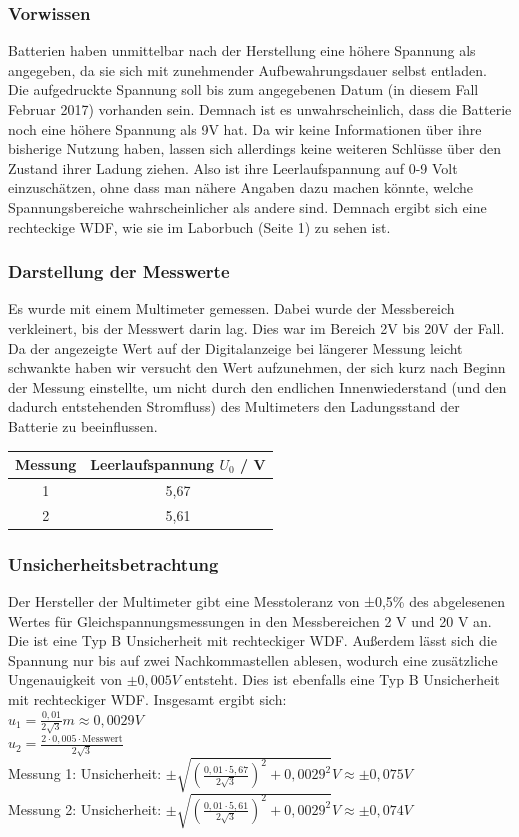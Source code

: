 \documentclass[
	a4paper,
	12pt,
	pagesize,
	ngerman
]{scrartcl}
\begin{document}
	\subsubsection{Vorwissen}
	Batterien haben unmittelbar nach der Herstellung eine höhere Spannung als angegeben, da sie sich mit zunehmender Aufbewahrungsdauer selbst entladen. Die aufgedruckte Spannung soll bis zum angegebenen Datum (in diesem Fall Februar 2017) vorhanden sein. Demnach ist es unwahrscheinlich, dass die Batterie noch eine höhere Spannung als 9V hat. Da wir keine Informationen über ihre bisherige Nutzung haben, lassen sich allerdings keine weiteren Schlüsse über den Zustand ihrer Ladung ziehen. Also ist ihre Leerlaufspannung auf 0-9 Volt einzuschätzen, ohne dass man nähere Angaben dazu machen könnte, welche Spannungsbereiche wahrscheinlicher als andere sind. Demnach ergibt sich eine rechteckige WDF, wie sie im Laborbuch (Seite 1) zu sehen ist. 
	\subsubsection{Darstellung der Messwerte}
	Es wurde mit einem Multimeter gemessen. Dabei wurde der Messbereich verkleinert, bis der Messwert darin lag. Dies war im Bereich 2V bis 20V der Fall.  Da der angezeigte Wert auf der Digitalanzeige bei längerer Messung leicht schwankte haben wir versucht den Wert aufzunehmen, der sich kurz nach Beginn der Messung einstellte, um nicht durch den endlichen Innenwiederstand (und den dadurch entstehenden Stromfluss) des Multimeters den Ladungsstand der Batterie zu beeinflussen. %
	\begin{tabular}{| c | c |}
		\hline
		Messung & Leerlaufspannung $U_0$ / \si{V}\\ \hline
		1 & 5,67\\
		2 & 5,61\\ \hline
	\end{tabular}
	\subsubsection{Unsicherheitsbetrachtung}
	Der Hersteller der Multimeter gibt eine Messtoleranz von ±0,5\% des abgelesenen Wertes für Gleichspannungsmessungen in den Messbereichen 2 V und 20 V an. Die ist eine Typ B Unsicherheit mit rechteckiger WDF. Außerdem lässt sich die Spannung nur bis auf zwei Nachkommastellen ablesen, wodurch eine zusätzliche Ungenauigkeit von $\pm 0,005\si{V}$ entsteht. Dies ist ebenfalls eine Typ B Unsicherheit mit rechteckiger WDF. Insgesamt ergibt sich: \\
	$u_1= \frac{0,01}{2\sqrt{3}} \si{m} \approx 0,0029 \si{V}$ \\
	$u_2= \frac{2 \cdot 0,005 \cdot \text{Messwert}}{2 \sqrt{3}}$ \\ %
	Messung 1: Unsicherheit: $\pm \sqrt{(\frac{0,01 \cdot 5,67}{2 \sqrt{3}})^2 + 0,0029^2} \si{V} \approx \pm 0,075 \si{V}$ \\
	Messung 2: Unsicherheit: $\pm \sqrt{(\frac{0,01 \cdot 5,61}{2 \sqrt{3}})^2 + 0,0029^2} \si{V} \approx \pm 0,074 \si{V}$ 
	
\end{document}
